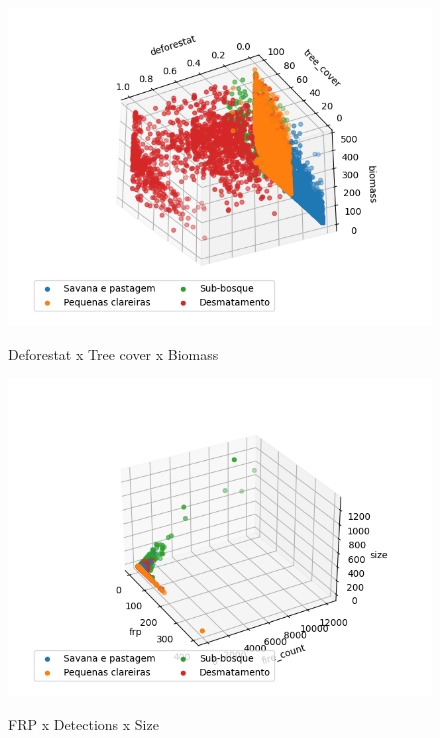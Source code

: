 \begin{multicols}{2}
\begin{figure}[H]
    \caption{Deforestat x Tree cover x Biomass}
     
    \centering 
    \includegraphics[width=1.1\linewidth]{tg1/figuras/deforestatxtree_coverxbiomass---30--120.png}
    \label{figura:three}
\end{figure}

\begin{figure}[H]
    \caption{FRP x Detections x Size}
     
    \centering 
    \includegraphics[width=1.1\linewidth]{tg1/figuras/frpxfire_countxsize-30--30.png}
    \label{figura:four}
\end{figure}


\end{multicols}
